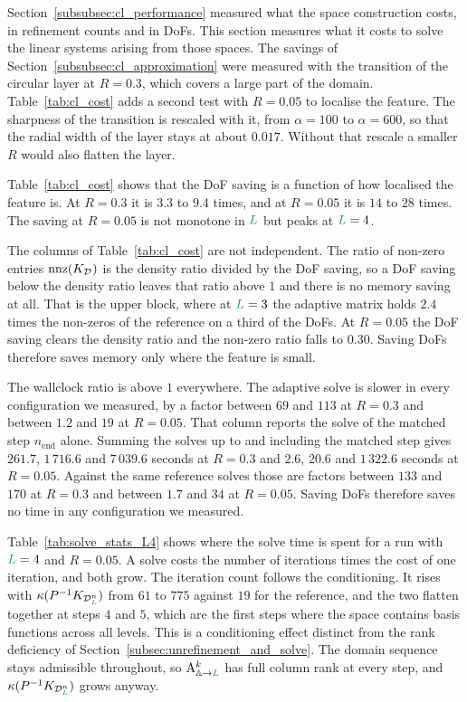 \documentclass[a4paper, 12pt]{article}
\makeatletter
\newcommand{\laststep}{{n_{\mathrm{end}}}}                      %
\newcommand{\totalDoFs}[1]{N\!\left(#1\right)}
\newcommand{\green}{\color{ForestGreen}}
\renewcommand{\L}{{\green L}}
\newcommand{\Amat}[3]{\mathbf{\mathrm{A}}^{#1}_{#2 \to #3}}
\newcommand{\activeDoFs}{\mathbb{A}}
\theoremstyle{definition}
\theoremstyle{plain}
\numberwithin{equation}{section}
\DeclareRobustCommand{\domseq}[1][]{\mathcal{D}\ifx\@empty#1\@empty\else_{#1}\fi}
\makeatother
\begin{document}
Section~\ref{subsubsec:cl_performance} measured what the space construction costs, in refinement counts and in DoFs. This section measures what it costs to solve the linear systems arising from those spaces. The savings of Section~\ref{subsubsec:cl_approximation} were measured with the transition of the circular layer at $R = 0.3$, which covers a large part of the domain. Table~\ref{tab:cl_cost} adds a second test with $R = 0.05$ to localise the feature. The sharpness of the transition is rescaled with it, from $\alpha = 100$ to $\alpha = 600$, so that the radial width of the layer stays at about $0.017$. Without that rescale a smaller $R$ would also flatten the layer.

Table~\ref{tab:cl_cost} shows that the DoF saving is a function of how localised the feature is. At $R = 0.3$ it is $3.3$ to $9.4$ times, and at $R = 0.05$ it is $14$ to $28$ times. The saving at $R = 0.05$ is not monotone in $\L$ but peaks at $\L = 4$.

The columns of Table~\ref{tab:cl_cost} are not independent. The ratio of non-zero entries $\mathrm{nnz}(K_{\domseq})$ is the density ratio divided by the DoF saving, so a DoF saving below the density ratio leaves that ratio above $1$ and there is no memory saving at all. That is the upper block, where at $\L = 3$ the adaptive matrix holds $2.4$ times the non-zeros of the reference on a third of the DoFs. At $R = 0.05$ the DoF saving clears the density ratio and the non-zero ratio falls to $0.30$. Saving DoFs therefore saves memory only where the feature is small.

The wallclock ratio is above $1$ everywhere. The adaptive solve is slower in every configuration we measured, by a factor between $69$ and $113$ at $R = 0.3$ and between $1.2$ and $19$ at $R = 0.05$. That column reports the solve of the matched step $\laststep$ alone. Summing the solves up to and including the matched step gives $261.7$, $1\,716.6$ and $7\,039.6$ seconds at $R = 0.3$ and $2.6$, $20.6$ and $1\,322.6$ seconds at $R = 0.05$. Against the same reference solves those are factors between $133$ and $170$ at $R = 0.3$ and between $1.7$ and $34$ at $R = 0.05$. Saving DoFs therefore saves no time in any configuration we measured.

\smallskip

Table~\ref{tab:solve_stats_L4} shows where the solve time is spent for a run with $\L = 4$ and $R = 0.05$. A solve costs the number of iterations times the cost of one iteration, and both grow. The iteration count follows the conditioning. It rises with $\kappa(P^{-1}K_{\domseq[\L]^n})$ from $61$ to $775$ against $19$ for the reference, and the two flatten together at steps $4$ and $5$, which are the first steps where the space contains basis functions across all levels. This is a conditioning effect distinct from the rank deficiency of Section~\ref{subsec:unrefinement_and_solve}. The domain sequence stays admissible throughout, so $\Amat{k}{\activeDoFs}{\L}$ has full column rank at every step, and $\kappa(P^{-1}K_{\domseq[\L]^n})$ grows anyway.
\end{document}
